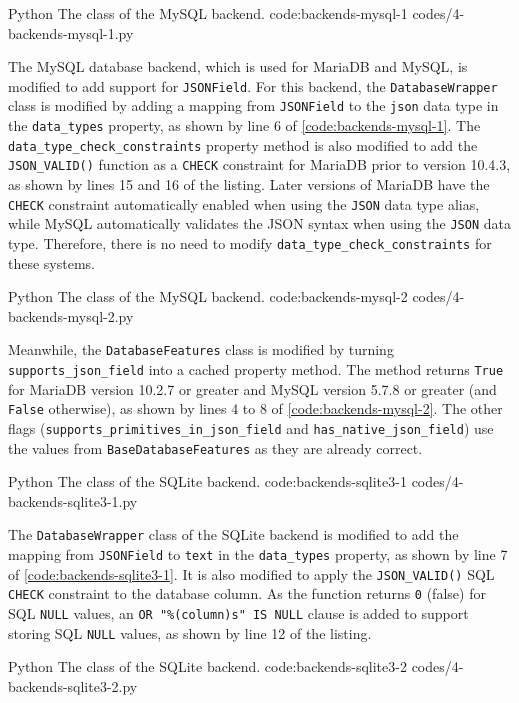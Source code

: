 \listing
{Python}
{The  class of the MySQL backend.}
{code:backends-mysql-1}
{codes/4-backends-mysql-1.py}

The MySQL database backend, which is used for MariaDB and MySQL, is modified to
add support for \verb|JSONField|. For this backend, the \verb|DatabaseWrapper|
class is modified by adding a mapping from \verb|JSONField| to the \verb|json|
data type in the \verb|data_types| property, as shown by line 6 of
\autoref{code:backends-mysql-1}. The \verb|data_type_check_constraints|
property method is also modified to add the \verb|JSON_VALID()| function as a
\verb|CHECK| constraint for MariaDB prior to version 10.4.3, as shown by lines
15 and 16 of the listing. Later versions of MariaDB have the \verb|CHECK|
constraint automatically enabled when using the \verb|JSON| data type alias,
while MySQL automatically validates the JSON syntax when using the \verb|JSON|
data type. Therefore, there is no need to modify
\verb|data_type_check_constraints| for these systems.

\listing
{Python}
{The  class of the MySQL backend.}
{code:backends-mysql-2}
{codes/4-backends-mysql-2.py}

Meanwhile, the \verb|DatabaseFeatures| class is modified by turning
\verb|supports_json_field| into a cached property method. The method returns
\verb|True| for MariaDB version 10.2.7 or greater and MySQL version 5.7.8 or
greater (and \verb|False| otherwise), as shown by lines 4 to 8 of
\autoref{code:backends-mysql-2}. The other flags
(\verb|supports_primitives_in_json_field| and \verb|has_native_json_field|)
use the values from \verb|BaseDatabaseFeatures| as they are already correct.

\listing
{Python}
{The  class of the SQLite backend.}
{code:backends-sqlite3-1}
{codes/4-backends-sqlite3-1.py}

The \verb|DatabaseWrapper| class of the SQLite backend is modified to add the
mapping from \verb|JSONField| to \verb|text| in the \verb|data_types| property,
as shown by line 7 of \autoref{code:backends-sqlite3-1}. It is also modified to
apply the \verb|JSON_VALID()| SQL \verb|CHECK| constraint to the database
column. As the function returns \verb|0| (false) for SQL \verb|NULL| values, an
\verb|OR "%(column)s" IS NULL| clause is added to support storing SQL
\verb|NULL| values, as shown by line 12 of the listing.

\listing
{Python}
{The  class of the SQLite backend.}
{code:backends-sqlite3-2}
{codes/4-backends-sqlite3-2.py}

